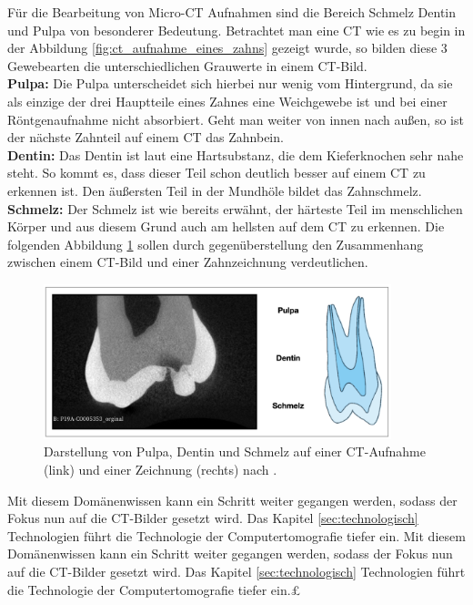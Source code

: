 Für die Bearbeitung von Micro-CT Aufnahmen sind die Bereich Schmelz Dentin und Pulpa
von besonderer Bedeutung. Betrachtet man eine CT wie es zu begin in der
Abbildung \ref{fig:ct_aufnahme_eines_zahns} gezeigt wurde, so bilden diese 3 Gewebearten
die unterschiedlichen Grauwerte in einem CT-Bild. \\ \textbf{Pulpa:} Die Pulpa unterscheidet
sich hierbei nur wenig vom Hintergrund, da sie als einzige der drei Hauptteile
eines Zahnes eine Weichgewebe ist und bei einer Röntgenaufnahme nicht absorbiert.
Geht man weiter von innen nach außen, so ist der nächste Zahnteil auf einem CT
das Zahnbein. \\ \textbf{Dentin:} Das Dentin ist laut \citet[Seite 41]{lehmann2012Zahnheilkunde}
eine Hartsubstanz, die dem Kieferknochen sehr nahe steht. So kommt es, dass dieser
Teil schon deutlich besser auf einem CT zu erkennen ist. Den äußersten Teil in
der Mundhöle bildet das Zahnschmelz. \\ \textbf{Schmelz:} Der Schmelz ist wie
bereits erwähnt, der härteste Teil im menschlichen Körper und aus diesem Grund auch
am hellsten auf dem CT zu erkennen. Die folgenden Abbildung
\ref{fig:pulpa_dentin_schmelz} sollen durch gegenüberstellung den Zusammenhang
zwischen einem CT-Bild und einer Zahnzeichnung verdeutlichen.

\begin{figure}[h]
	\centering
	\includegraphics[width=0.9\textwidth]{
		img/Bildschirmfoto 2024-11-22 um 15.13.24.jpg
	}
	\caption{Darstellung von Pulpa, Dentin und Schmelz auf einer CT-Aufnahme (link)
	und einer Zeichnung (rechts) nach \citet[Seite 29]{lehmann2012Zahnheilkunde}. }
	\label{fig:pulpa_dentin_schmelz}
\end{figure}

Mit diesem Domänenwissen kann ein Schritt weiter gegangen werden, sodass der
Fokus nun auf die CT-Bilder gesetzt wird. Das Kapitel \ref{sec:technologisch} Technologien
führt die Technologie der Computertomografie tiefer ein. Mit diesem
Domänenwissen kann ein Schritt weiter gegangen werden, sodass der Fokus nun auf die
CT-Bilder gesetzt wird. Das Kapitel \ref{sec:technologisch} Technologien führt
die Technologie der Computertomografie tiefer ein.£

